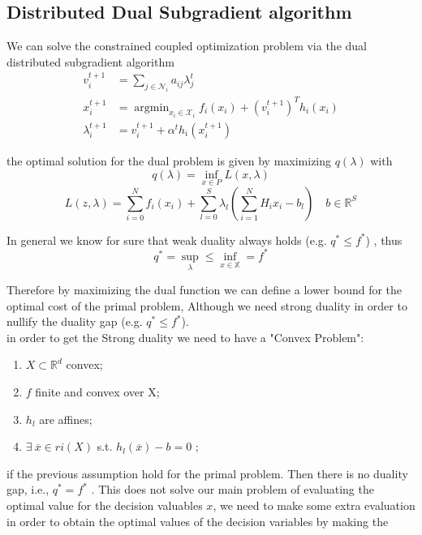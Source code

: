 \documentclass{article}
\DeclareMathOperator*{\argmin}{argmin}
\begin{document}
\subsection{Distributed Dual Subgradient algorithm}
We can solve the constrained coupled optimization problem via the dual distributed subgradient algorithm 
\begin{align}
    v_i^{t+1} &= \sum_{j\in \mathcal{N}_i}^{} a_{ij}\lambda_j^t \\
    x_i^{t+1} &=  \argmin_{x_i\in \mathcal{X}_i} f_i(x_i) + (v_i^{t+1})^Th_i(x_i)\\
    \lambda_i^{t+1}&=v_i^{t+1}+\alpha^th_i(x_i^{t+1})
\end{align}

\noindent the optimal solution for the dual problem is given by maximizing ${q(\lambda)}$ 
with 
\begin{equation} q(\lambda)= \inf_{x\in P} L(x,\lambda) \end{equation} 
\begin{equation}   L(z,\lambda) = \sum_{i=0}^{N} f_i(x_i) + \sum_{l=0}^{S}\lambda_l(\sum_{i=1}^{N}H_i x_i-b_l) \quad b \in {\mathbb R}^S 
\end{equation}

\noindent In general we know for sure that weak duality always holds (e.g. ${q^*\leq f^*}$) ,
thus
\begin{equation}
    q^*=\sup_{\lambda} \leq \inf_{x \in \mathbb{X}}=f^*
\end{equation}

Therefore by maximizing the dual function we can define a lower bound for the optimal cost of the primal problem, Although we need strong duality in order to nullify the duality gap (e.g. ${q^*\leq f^*}$). \\
in order to get the Strong duality we need to have a "Convex Problem":
\begin{enumerate}
    \item ${ X\subset {\mathbb R}^d}$ convex;
    \item ${f}$ finite and convex over X;
    \item ${h_l}$ are affines;
    \item  ${\exists \ \overline{x} \in ri(X)}$ s.t. ${h_l(\overline{x})-b=0}$ ;
    
\end{enumerate}
if the previous assumption hold for the primal problem. Then there is no duality gap, i.e., ${q^* = f^*}$ .
This does not solve our main problem of evaluating the optimal value for the decision valuables ${x}$, we need to make some extra evaluation in order to obtain the optimal values of the decision variables by making the 
  
\end{document}
